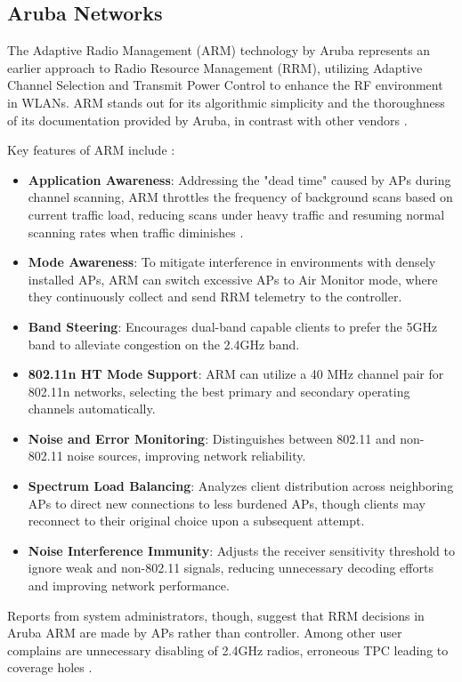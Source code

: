 \subsection{Aruba Networks}
The Adaptive Radio Management (ARM) technology by Aruba represents an earlier approach to Radio Resource Management (RRM), utilizing Adaptive Channel Selection and Transmit Power Control to enhance the RF environment in WLANs. ARM stands out for its algorithmic simplicity and the thoroughness of its documentation provided by Aruba, in contrast with other vendors \cite{ArubaOSUserGuide}.

Key features of ARM include \cite{ARMOverview}:
\begin{itemize}
\item \textbf{Application Awareness}: Addressing the "dead time" caused by APs during channel scanning, ARM throttles the frequency of background scans based on current traffic load, reducing scans under heavy traffic and resuming normal scanning rates when traffic diminishes \cite{UnderstandingARM}.
\item \textbf{Mode Awareness}: To mitigate interference in environments with densely installed APs, ARM can switch excessive APs to Air Monitor mode, where they continuously collect and send RRM telemetry to the controller.
\item \textbf{Band Steering}: Encourages dual-band capable clients to prefer the 5GHz band to alleviate congestion on the 2.4GHz band.
\item \textbf{802.11n HT Mode Support}: ARM can utilize a 40 MHz channel pair for 802.11n networks, selecting the best primary and secondary operating channels automatically.
\item \textbf{Noise and Error Monitoring}: Distinguishes between 802.11 and non-802.11 noise sources, improving network reliability.
\item \textbf{Spectrum Load Balancing}: Analyzes client distribution across neighboring APs to direct new connections to less burdened APs, though clients may reconnect to their original choice upon a subsequent attempt.
\item \textbf{Noise Interference Immunity}: Adjusts the receiver sensitivity threshold to ignore weak and non-802.11 signals, reducing unnecessary decoding efforts and improving network performance.
\end{itemize}

Reports from system administrators, though, suggest that RRM decisions in Aruba ARM are made by APs rather than controller. Among other user complains are unnecessary disabling of 2.4GHz radios, erroneous TPC leading to coverage holes \cite{TamingArubaARM2012}.

